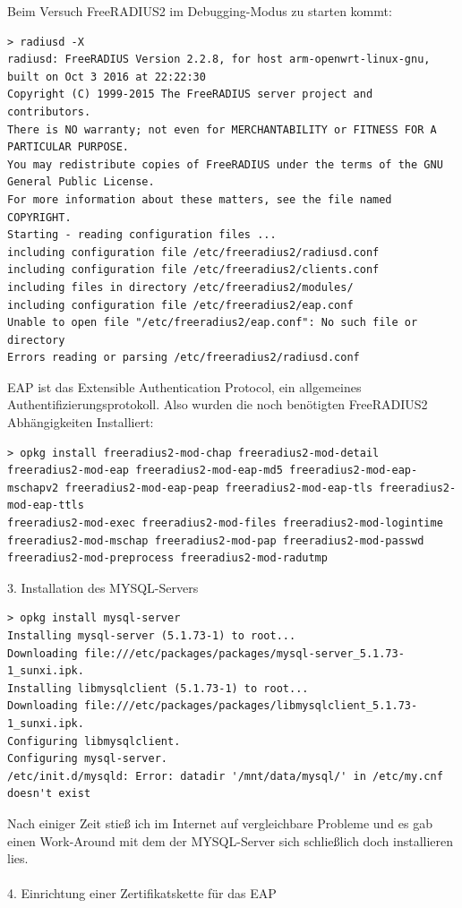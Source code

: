 {{Beim Versuch FreeRADIUS2 im Debugging-Modus zu starten kommt:\
\begin{lstlisting}
> radiusd -X
radiusd: FreeRADIUS Version 2.2.8, for host arm-openwrt-linux-gnu, built on Oct 3 2016 at 22:22:30
Copyright (C) 1999-2015 The FreeRADIUS server project and contributors.
There is NO warranty; not even for MERCHANTABILITY or FITNESS FOR A PARTICULAR PURPOSE.
You may redistribute copies of FreeRADIUS under the terms of the GNU General Public License.
For more information about these matters, see the file named COPYRIGHT.
Starting - reading configuration files ...
including configuration file /etc/freeradius2/radiusd.conf
including configuration file /etc/freeradius2/clients.conf
including files in directory /etc/freeradius2/modules/
including configuration file /etc/freeradius2/eap.conf
Unable to open file "/etc/freeradius2/eap.conf": No such file or directory
Errors reading or parsing /etc/freeradius2/radiusd.conf
\end{lstlisting}
EAP ist das Extensible Authentication Protocol, ein allgemeines Authentifizierungsprotokoll. Also
wurden die noch benötigten FreeRADIUS2 Abhängigkeiten Installiert:
\begin{lstlisting}
> opkg install freeradius2-mod-chap freeradius2-mod-detail freeradius2-mod-eap freeradius2-mod-eap-md5 freeradius2-mod-eap-mschapv2 freeradius2-mod-eap-peap freeradius2-mod-eap-tls freeradius2-mod-eap-ttls
freeradius2-mod-exec freeradius2-mod-files freeradius2-mod-logintime
freeradius2-mod-mschap freeradius2-mod-pap freeradius2-mod-passwd
freeradius2-mod-preprocess freeradius2-mod-radutmp
\end{lstlisting}
3. Installation des MYSQL-Servers
\begin{lstlisting}
> opkg install mysql-server
Installing mysql-server (5.1.73-1) to root...
Downloading file:///etc/packages/packages/mysql-server_5.1.73-1_sunxi.ipk.
Installing libmysqlclient (5.1.73-1) to root...
Downloading file:///etc/packages/packages/libmysqlclient_5.1.73-1_sunxi.ipk.
Configuring libmysqlclient.
Configuring mysql-server.
/etc/init.d/mysqld: Error: datadir '/mnt/data/mysql/' in /etc/my.cnf
doesn't exist
\end{lstlisting}
Nach einiger Zeit stieß ich im Internet auf vergleichbare Probleme und es gab einen Work-Around
mit dem der MYSQL-Server sich schließlich doch installieren lies.\\
~\\
4. Einrichtung einer Zertifikatskette für das EAP
\begin{lstlisting}

\end{lstlisting}}}
